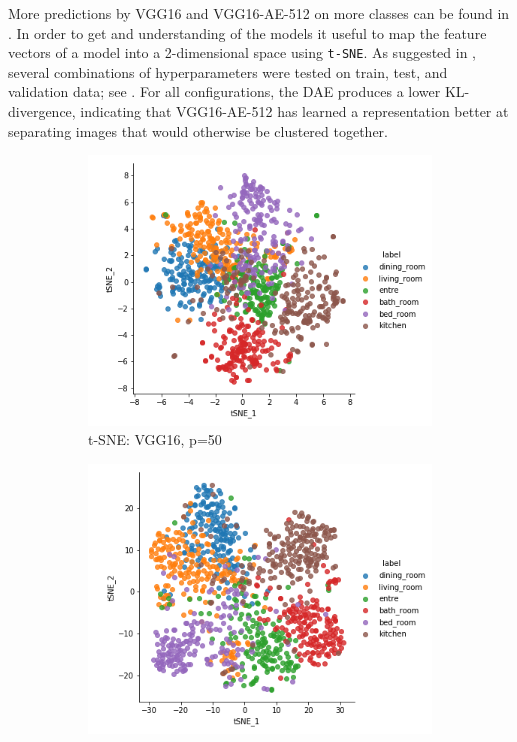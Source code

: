 More predictions by VGG16 and VGG16-AE-512 on more classes can be found in .
\newline
\newline
In order to get and understanding of the models it useful to map the feature vectors of a model into a 2-dimensional space using \texttt{t-SNE}\autocite{Chu2017}\autocite{HintonScience2006}. 
As suggested in \autocite{wattenberg2016how}, several combinations of hyperparameters were tested on train, test, and validation data; see .
For all configurations, the DAE produces a lower KL-divergence, indicating that VGG16-AE-512 has learned a representation better at separating images that would otherwise be clustered together.

\begin{figure}[H]
    \centering
    \begin{subfigure}[b]{0.47\textwidth}
      \includegraphics[width=\textwidth]{pictures/plots/tsne_vgg16}
      \caption{t-SNE: VGG16, p=50}
      \label{fig:tsne1}
    \end{subfigure}
    \begin{subfigure}[b]{0.47\textwidth}
      \includegraphics[width=\textwidth]{pictures/plots/tsne_vgg16_dae}

\end{subfigure}
\end{figure}
